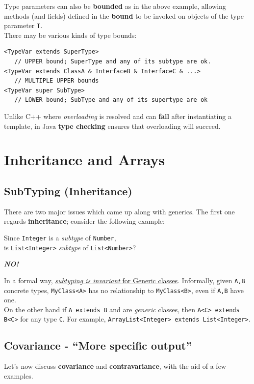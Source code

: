 Type parameters can also be \textbf{bounded} as in the above example,
allowing methods (and fields) defined in the \textbf{bound} to be invoked on objects of the type parameter \lstinline|T|.\\
There may be various kinds of type bounds:
\begin{lstlisting}
<TypeVar extends SuperType>
   // UPPER bound; SuperType and any of its subtype are ok.
<TypeVar extends ClassA & InterfaceB & InterfaceC & ...>
   // MULTIPLE UPPER bounds
<TypeVar super SubType>
   // LOWER bound; SubType and any of its supertype are ok
\end{lstlisting}

Unlike C++ where \textit{overloading} is resolved and can \textbf{fail} after
instantiating a template, in Java \textbf{type checking} ensures that
overloading will succeed.

\newpage
\section{Inheritance and Arrays}
\subsection{SubTyping (Inheritance)}
There are two major issues which came up along with generics.
The first one regards \textbf{inheritance}; 
consider the following example:
\begin{center}
   Since \lstinline|Integer| is a \textit{subtype} of \lstinline|Number|,\\
   is \lstinline|List<Integer>| \textit{subtype} of \lstinline|List<Number>|?\nl

   {\color{red}\textbf{\textit{NO!}}}
\end{center}
In a formal way, \ul{\textit{subtyping is invariant} for Generic classes}.
Informally, given \lstinline|A,B| concrete types, \lstinline|MyClass<A>| has no relationship to \lstinline|MyClass<B>|,
even if \lstinline|A,B| have one.\\
On the other hand if \lstinline|A extends B| and are \textit{generic} classes, 
then \lstinline|A<C> extends B<C>| for any type \lstinline|C|.
For example, \lstinline|ArrayList<Integer> extends List<Integer>|.
\nl

\subsection{Covariance - ``More specific output''}
Let's now discuss \textbf{covariance} and \textbf{contravariance}, with the aid of a few examples.


